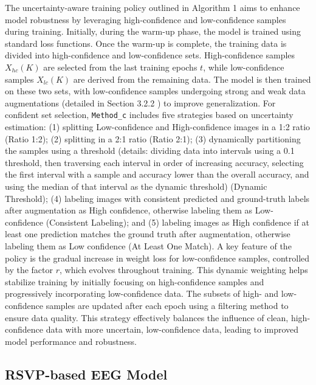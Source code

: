 \documentclass[preprint,12pt,authoryear]{elsarticle}
\begin{document}
The uncertainty-aware training policy outlined in Algorithm 1 aims to enhance model robustness by leveraging high-confidence and low-confidence samples during training. Initially, during the warm-up phase, the model is trained using standard loss functions. Once the warm-up is complete, the training data is divided into high-confidence and low-confidence sets. High-confidence samples \(X_{hc}(K)\) are selected from the last training epochs $t$, while low-confidence samples \(X_{lc}(K)\) are derived from the remaining data. The model is then trained on these two sets, with low-confidence samples undergoing strong and weak data augmentations (detailed in Section 3.2.2 ) to improve generalization. For confident set selection, \texttt{Method\_c} includes five strategies based on uncertainty estimation: (1) splitting Low-confidence and High-confidence images in a 1:2 ratio (Ratio 1:2); (2) splitting in a 2:1 ratio (Ratio 2:1); (3) dynamically partitioning the samples using a threshold (details: dividing data into intervals using a 0.1 threshold, then traversing each interval in order of increasing accuracy, selecting the first interval with a sample and accuracy lower than the overall accuracy, and using the median of that interval as the dynamic threshold) (Dynamic Threshold); (4) labeling images with consistent predicted and ground-truth labels after augmentation as High confidence, otherwise labeling them as Low-confidence (Consistent Labeling); and (5) labeling images as High confidence if at least one prediction matches the ground truth after augmentation, otherwise labeling them as Low confidence (At Least One Match). A key feature of the policy is the gradual increase in weight loss for low-confidence samples, controlled by the factor $r$, which evolves throughout training. This dynamic weighting helps stabilize training by initially focusing on high-confidence samples and progressively incorporating low-confidence data. The subsets of high- and low-confidence samples are updated after each epoch using a filtering method to ensure data quality. This strategy effectively balances the influence of clean, high-confidence data with more uncertain, low-confidence data, leading to improved model performance and robustness.


\subsection{RSVP-based EEG Model}\label{stage-2-brain-machine-synergy}
\end{document}
